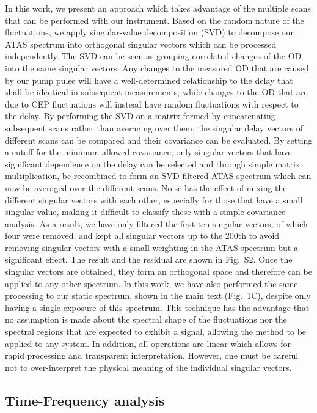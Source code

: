 \documentclass[12pt]{article}
\begin{document}
In this work, we present an approach which takes advantage of the multiple scans that can be performed with our instrument. Based on the random nature of the fluctuations, we apply singular-value decomposition (SVD) to decompose our ATAS spectrum into orthogonal singular vectors which can be processed independently. The SVD can be seen as grouping correlated changes of the OD into the same singular vectors. Any changes to the measured OD that are caused by our pump pulse will have a well-determined relationship to the delay that shall be identical in subsequent measurements, while changes to the OD that are due to CEP fluctuations will instead have random fluctuations with respect to the delay. By performing the SVD on a matrix formed by concatenating subsequent scans rather than averaging over them, the singular delay vectors of different scans can be compared and their covariance can be evaluated. By setting a cutoff for the minimum allowed covariance, only singular vectors that have significant dependence on the delay can be selected and through simple matrix multiplication, be recombined to form an SVD-filtered ATAS spectrum which can now be averaged over the different scans. Noise has the effect of mixing the different singular vectors with each other, especially for those that have a small singular value, making it difficult to classify these with a simple covariance analysis. As a result, we have only filtered the first ten singular vectors, of which four were removed, and kept all singular vectors up to the 200th to avoid removing singular vectors with a small weighting in the ATAS spectrum but a significant effect. The result and the residual are shown in Fig.~S2. Once the singular vectors are obtained, they form an orthogonal space and therefore can be applied to any other spectrum. In this work, we have also performed the same processing to our static spectrum, shown in the main text (Fig.~1C), despite only having a single exposure of this spectrum. This technique has the advantage that no assumption is made about the spectral shape of the fluctuations nor the spectral regions that are expected to exhibit a signal, allowing the method to be applied to any system. In addition, all operations are linear which allows for rapid processing and transparent interpretation. However, one must be careful not to over-interpret the physical meaning of the individual singular vectors. 

\subsection{Time-Frequency analysis}
\end{document}
